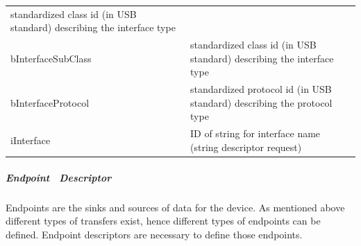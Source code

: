 \begin{longtable}[]{@{}ll@{}}
\begin{minipage}[t]{0.47\columnwidth}
{standardized class id (in USB standard) describing the interface type}
\strut\end{minipage}\tabularnewline
\begin{minipage}[t]{0.47\columnwidth}\raggedright\strut
{bInterfaceSubClass}
\strut\end{minipage} &
\begin{minipage}[t]{0.47\columnwidth}\raggedright\strut
{standardized class id (in USB standard) describing the interface type}
\strut\end{minipage}\tabularnewline
\begin{minipage}[t]{0.47\columnwidth}\raggedright\strut
{bInterfaceProtocol}
\strut\end{minipage} &
\begin{minipage}[t]{0.47\columnwidth}\raggedright\strut
{standardized protocol id (in USB standard) describing the protocol
type}
\strut\end{minipage}\tabularnewline
\begin{minipage}[t]{0.47\columnwidth}\raggedright\strut
{iInterface}
\strut\end{minipage} &
\begin{minipage}[t]{0.47\columnwidth}\raggedright\strut
{ID of string for interface name (string descriptor request)}
\strut\end{minipage}\tabularnewline
\bottomrule
\end{longtable}

{}

\hypertarget{h.v1p4ngh8b7ot}{\subparagraph{\texorpdfstring{{Endpoint
~Descriptor}}{Endpoint ~Descriptor}}\label{h.v1p4ngh8b7ot}}

{Endpoints are the sinks and sources of data for the device. As
mentioned above different types of transfers exist, hence different
types of endpoints can be defined. Endpoint descriptors are necessary to
define those endpoints.}

\href{}{}\href{}{}

